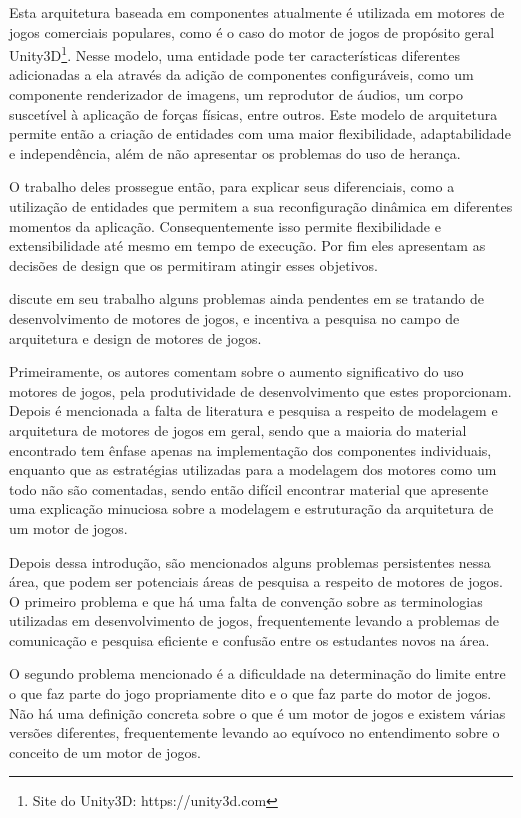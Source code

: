 Esta arquitetura baseada em componentes atualmente é utilizada em motores de jogos 
comerciais populares, como é o caso do motor de jogos de propósito geral 
Unity3D\footnote{Site do Unity3D: https://unity3d.com}. Nesse 
modelo, uma entidade pode ter características diferentes adicionadas a ela através da 
adição de componentes configuráveis, como um componente renderizador de imagens, um 
reprodutor de áudios, um corpo suscetível à aplicação de forças físicas, entre outros. 
Este modelo de arquitetura permite então a criação de entidades com uma maior 
flexibilidade, adaptabilidade e independência, além de não apresentar os problemas do 
uso de herança.

O trabalho deles prossegue então, para explicar seus diferenciais, como a utilização de 
entidades que permitem a sua reconfiguração dinâmica em diferentes 
momentos da aplicação. Consequentemente isso permite flexibilidade e extensibilidade 
até mesmo em tempo de execução. Por fim eles apresentam as decisões de design que os 
permitiram atingir esses objetivos.

 discute em seu trabalho alguns problemas ainda pendentes 
em se tratando de desenvolvimento de motores de jogos, e incentiva a pesquisa no campo 
de arquitetura e design de motores de jogos. 

Primeiramente, os autores comentam sobre o aumento significativo do uso motores de 
jogos, pela produtividade de desenvolvimento que estes proporcionam. Depois é mencionada a falta 
de literatura e pesquisa a respeito de modelagem e arquitetura de motores de jogos em 
geral, sendo que a maioria do material encontrado tem ênfase apenas na implementação dos 
componentes individuais, enquanto que as estratégias utilizadas para a modelagem dos 
motores como um todo não são comentadas, sendo então difícil encontrar material que 
apresente uma explicação minuciosa sobre a modelagem e estruturação da arquitetura de 
um motor de jogos.

Depois dessa introdução, são mencionados alguns problemas persistentes nessa área, que 
podem ser potenciais áreas de pesquisa a respeito de motores de jogos. O primeiro 
problema e que há uma falta de convenção sobre as terminologias utilizadas em desenvolvimento de 
jogos, frequentemente levando a problemas de comunicação e pesquisa eficiente e confusão 
entre os estudantes novos na área. 

O segundo problema mencionado é a dificuldade na determinação do limite entre o que faz 
parte do jogo propriamente dito e o que faz parte do motor de jogos. Não há uma 
definição concreta sobre o que é um motor de jogos e existem várias versões diferentes, 
frequentemente levando ao equívoco no entendimento sobre o conceito de um motor de 
jogos. 

